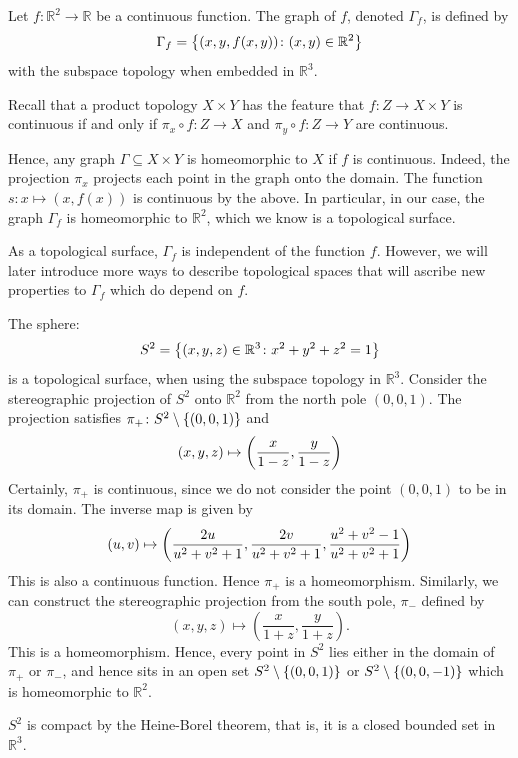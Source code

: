 \documentclass[a4paper]{article}
\begin{document}
\begin{example}
    Let \( f \colon \mathbb R^2 \to \mathbb R \) be a continuous function.
	The graph of \( f \), denoted \( \Gamma_f \), is defined by
	\[
		\Gamma_f = \qty{(x,y,f(x,y)) \colon (x,y) \in \mathbb R^2}
	\]
	with the subspace topology when embedded in \( \mathbb R^3 \).

	Recall that a product topology \( X \times Y \) has the feature that \( f \colon Z \to X \times Y \) is continuous if and only if \( \pi_x \circ f \colon Z \to X \) and \( \pi_y \circ f \colon Z \to Y \) are continuous.

	Hence, any graph \( \Gamma \subseteq X \times Y \) is homeomorphic to \( X \) if \( f \) is continuous.
	Indeed, the projection \( \pi_x \) projects each point in the graph onto the domain.
	The function \( s \colon x \mapsto (x,f(x)) \) is continuous by the above.
	In particular, in our case, the graph \( \Gamma_f \) is homeomorphic to \( \mathbb R^2 \), which we know is a topological surface.
\end{example}
\begin{remark}
	As a topological surface, \( \Gamma_f \) is independent of the function \( f \).
	However, we will later introduce more ways to describe topological spaces that will ascribe new properties to \( \Gamma_f \) which do depend on \( f \).
\end{remark}
\begin{example}
	The sphere:
	\[
		S^2 = \qty{(x,y,z) \in \mathbb R^3 \colon x^2 + y^2 + z^2 = 1}
	\]
	is a topological surface, when using the subspace topology in \( \mathbb R^3 \).
	Consider the stereographic projection of \( S^2 \) onto \( \mathbb R^2 \) from the north pole \( (0,0,1) \).
	The projection satisfies \( \pi_+ \colon S^2 \setminus \qty{(0,0,1)} \) and
	\[
		(x,y,z) \mapsto \qty(\frac{x}{1-z}, \frac{y}{1-z})
	\]
	Certainly, \( \pi_+ \) is continuous, since we do not consider the point \( (0,0,1) \) to be in its domain.
	The inverse map is given by
	\[
		(u,v) \mapsto \qty(\frac{2u}{u^2+v^2+1}, \frac{2v}{u^2+v^2+1}, \frac{u^2+v^2-1}{u^2+v^2+1})
	\]
	This is also a continuous function.
	Hence \( \pi_+ \) is a homeomorphism.
	Similarly, we can construct the stereographic projection from the south pole, \( \pi_- \) defined by 
    \[
        (x,y,z) \mapsto \left( \frac{x}{1+z},\frac{y}{1+z} \right). 
    \]
	This is a homeomorphism.
	Hence, every point in \( S^2 \) lies either in the domain of \( \pi_+ \) or \( \pi_- \), and hence sits in an open set \( S^2 \setminus \qty{(0,0,1)} \) or \( S^2 \setminus \qty{(0,0,-1)} \) which is homeomorphic to \( \mathbb R^2 \).
\end{example}
\begin{note}
	\( S^2 \) is compact by the Heine-Borel theorem, that is, it is a closed bounded set in \( \mathbb R^3 \).
\end{note}
\end{document}

